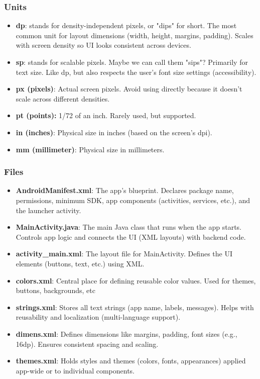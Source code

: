 \documentclass{report}
\begin{document}
    \pagebreak 
    \subsubsection{Units}
    \begin{itemize}
        \item \textbf{dp}: stands for density-independent pixels, or "dips" for short.
            \bigbreak \noindent 
            The most common unit for layout dimensions (width, height, margins, padding). Scales with screen density so UI looks consistent across devices.
        \item \textbf{sp}: stands for scalable pixels. Maybe we can call them "sips"?
            \bigbreak \noindent 
            Primarily for text size. Like dp, but also respects the user's font size settings (accessibility).
        \item \textbf{px (pixels)}: Actual screen pixels. Avoid using directly because it doesn't scale across different densities.
        \item \textbf{pt (points):} 1/72 of an inch. Rarely used, but supported.
        \item \textbf{in (inches)}: Physical size in inches (based on the screen's dpi).
        \item \textbf{mm (millimeter)}: Physical size in millimeters.
    \end{itemize}

    \pagebreak 
    \subsubsection{Files}
    \begin{itemize}
        \item \textbf{AndroidManifest.xml}: The app's blueprint. Declares package name, permissions, minimum SDK, app components (activities, services, etc.), and the launcher activity.
        \item \textbf{MainActivity.java}: The main Java class that runs when the app starts. Controls app logic and connects the UI (XML layouts) with backend code.
        \item \textbf{activity\_main.xml}: The layout file for MainActivity. Defines the UI elements (buttons, text, etc.) using XML.
        \item \textbf{colors.xml}: Central place for defining reusable color values. Used for themes, buttons, backgrounds, etc
        \item \textbf{strings.xml}: Stores all text strings (app name, labels, messages). Helps with reusability and localization (multi-language support).
        \item \textbf{dimens.xml}:  Defines dimensions like margins, padding, font sizes (e.g., 16dp). Ensures consistent spacing and scaling.
        \item \textbf{themes.xml}: Holds styles and themes (colors, fonts, appearances) applied app-wide or to individual components.
    \end{itemize}
\end{document}
